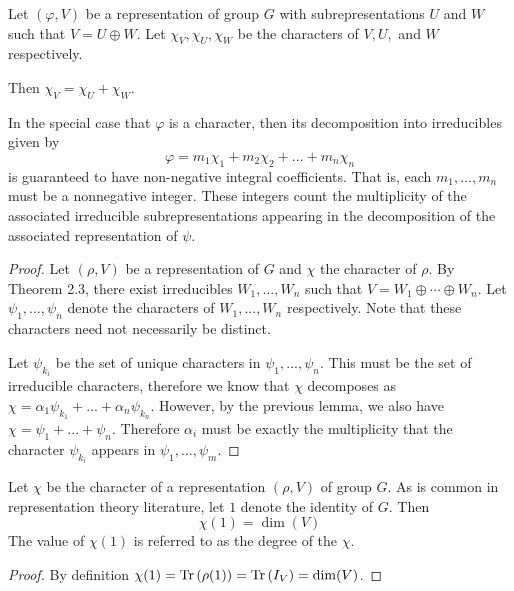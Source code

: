 \begin{lemma}
    Let $(\varphi, V)$ be a representation of group $G$ with subrepresentations $U$ and $W$ such that $V = U \oplus 
    W$. Let $\chi_V, \chi_U, \chi_W$ be the characters of $V, U,$ and $W$ respectively.

    Then $\chi_V = \chi_U + \chi_W$.
\end{lemma}

\begin{theorem}
    In the special case that $\varphi$ is a character, then its decomposition into irreducibles given by
    \[
        \varphi = m_1\chi_1 + m_2 \chi_2 + ... + m_n \chi_n
    \]
    is guaranteed to have non-negative integral coefficients. That is, each $m_1,...,m_n$ must be a nonnegative 
    integer. These integers count the multiplicity of the associated irreducible subrepresentations appearing in 
    the decomposition of the associated representation of $\psi$.
\end{theorem}

\begin{proof}
    Let $(\rho, V)$ be a representation of $G$ and $\chi$ the character of $\rho$. By Theorem 2.3, there exist 
    irreducibles $W_1, ..., W_n$ such that $V = W_1 \oplus \cdots \oplus W_n$. Let $\psi_1, ..., \psi_n$ denote the 
    characters of $W_1, ..., W_n$ respectively. Note that these characters need not necessarily be distinct.

Let $\psi_{k_i}$ be the set of unique characters in $\psi_1, ..., \psi_n$. This must be the set of irreducible 
characters, therefore we know that $\chi$ decomposes as $\chi = \alpha_1\psi_{k_1} + ... + \alpha_n\psi_{k_n}$.  
However, by the previous lemma, we also have $\chi = \psi_1 + ... +  \psi_n$. Therefore $\alpha_i$ must be exactly 
the multiplicity that the character $\psi_{k_i}$ appears in $\psi_1, ..., \psi_m$.
\end{proof}

\begin{proposition}
    Let $\chi$ be the character of a representation $(\rho, V)$ of group $G$. As is common in representation theory 
    literature, let $1$ denote the identity of $G$. Then
    \[
        \chi(1) = \dim(V)
    \]
    The value of $\chi(1)$ is referred to as the degree of the $\chi$.
\end{proposition}

\begin{proof}
    By definition $\chi(1) = \text{Tr}\,(\rho(1)) = \text{Tr}\,(I_V) =  \dim(V)$.
\end{proof}

